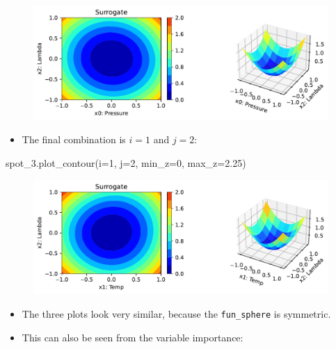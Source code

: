 \documentclass[
  letterpaper,
  DIV=11,
  numbers=noendperiod]{scrreprt}
\newenvironment{Shaded}{\begin{snugshade}}{\end{snugshade}}
\newcommand{\DecValTok}[1]{\textcolor[rgb]{0.68,0.00,0.00}{#1}}
\newcommand{\FloatTok}[1]{\textcolor[rgb]{0.68,0.00,0.00}{#1}}
\newcommand{\NormalTok}[1]{\textcolor[rgb]{0.00,0.23,0.31}{#1}}
\newcommand{\OperatorTok}[1]{\textcolor[rgb]{0.37,0.37,0.37}{#1}}
\providecommand{\tightlist}{%
  \setlength{\itemsep}{0pt}\setlength{\parskip}{0pt}}\usepackage{longtable,booktabs,array}
\begin{document}
\begin{figure}[H]

{\centering \includegraphics{008_num_spot_multidim_files/figure-pdf/cell-9-output-1.pdf}

}

\end{figure}

\begin{itemize}
\tightlist
\item
  The final combination is \(i=1\) and \(j=2\):
\end{itemize}

\begin{Shaded}
\begin{Highlighting}[]
\NormalTok{spot\_3.plot\_contour(i}\OperatorTok{=}\DecValTok{1}\NormalTok{, j}\OperatorTok{=}\DecValTok{2}\NormalTok{, min\_z}\OperatorTok{=}\DecValTok{0}\NormalTok{, max\_z}\OperatorTok{=}\FloatTok{2.25}\NormalTok{)}
\end{Highlighting}
\end{Shaded}

\begin{figure}[H]

{\centering \includegraphics{008_num_spot_multidim_files/figure-pdf/cell-10-output-1.pdf}

}

\end{figure}

\begin{itemize}
\tightlist
\item
  The three plots look very similar, because the \texttt{fun\_sphere} is
  symmetric.
\item
  This can also be seen from the variable importance:
\end{itemize}
\end{document}
